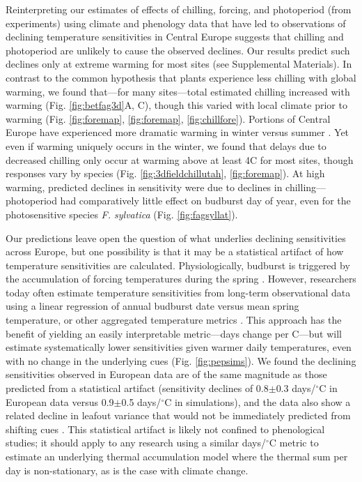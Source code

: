 \documentclass{article}
\begin{document}
\par Reinterpreting our estimates of effects of chilling, forcing, and photoperiod (from experiments) using climate and phenology data that have led to observations of declining temperature sensitivities in Central Europe suggests that chilling and photoperiod are unlikely to cause the observed declines. Our results predict such declines only at extreme warming for most sites (see Supplemental Materials). In contrast to the common hypothesis that plants experience less chilling with global warming, we found that---for many sites---total estimated chilling increased with warming (Fig. \ref{fig:betfag3d}A, C), though this varied with local climate prior to warming (Fig. \ref{fig:foremap}, \ref{fig:foremap}, \ref{fig:chillfore}). 
Portions of Central Europe have experienced more dramatic warming in winter versus summer \emph{\citep[][]{li2015,balling1998}}. Yet even if warming uniquely occurs in the winter, we found that delays due to decreased chilling only occur at warming above at least 4\degree C for most sites, though responses vary by species (Fig. \ref{fig:3dfieldchillutah}, \ref{fig:foremap}). At high warming, predicted declines in sensitivity were due to declines in chilling---photoperiod had comparatively little effect on budburst day of year, even for the photosensitive species \emph{F. sylvatica} (Fig. \ref{fig:fagsyllat}). 

\par Our predictions leave open the question of what underlies declining sensitivities across Europe, but one possibility is that it may be a statistical artifact of how temperature sensitivities are calculated. Physiologically, budburst is triggered by the accumulation of forcing temperatures during the spring \emph{\citep{chuine2016,hanninen1995}}. However, researchers today often estimate temperature sensitivities from long-term observational data using a linear regression of annual budburst date versus mean spring temperature, or other aggregated temperature metrics \emph{\citep[e.g.,][]{Wolkovich:2012n}}. This approach has the benefit of yielding an easily interpretable metric---days change per \degree C---but will estimate systematically lower sensitivities given warmer daily temperatures, even with no change in the underlying cues (Fig. \ref{fig:pepsims}). We found the declining sensitivities observed in European data are of the same magnitude as those predicted from a statistical artifact (sensitivity declines of 0.8$\pm$0.3 days/$^{\circ}$C in European data versus 0.9$\pm$0.5 days/$^{\circ}$C in simulations), and the data also show a related decline in leafout variance that would not be immediately predicted from shifting cues \emph{\citep[ \emph{Potential statistical artifacts in declines of temperature sensitivity in observational long-term data} ][]{gusewell2017}}. This statistical artifact is likely not confined to phenological studies; it should apply to any research using a similar days/$^{\circ}$C metric to estimate an underlying thermal accumulation model where the thermal sum per day is non-stationary, as is the case with climate change. 
\end{document}
